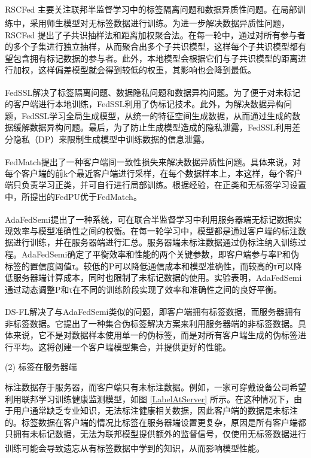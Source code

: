 RSCFed\textsuperscript{\cite{liang2022rscfed}} 主要关注联邦半监督学习中的标签隔离问题和数据异质性问题。在局部训练中，采用师生模型\textsuperscript{\cite{tarvainen2017mean}}对无标签数据进行训练。为进一步解决数据异质性问题，RSCFed 提出了子共识抽样法和距离加权聚合法。在每一轮中，通过对所有参与者的多个子集进行独立抽样，从而聚合出多个子共识模型，这样每个子共识模型都有望包含拥有标记数据的参与者。此外，本地模型会根据它们与子共识模型的距离进行加权，这样偏差模型就会得到较低的权重，其影响也会降到最低。

FedSSL\textsuperscript{\cite{fan2022private}}解决了标签隔离问题、数据隐私问题和数据异构问题。为了便于对未标记的客户端进行本地训练，FedSSL利用了伪标记技术。此外，为解决数据异构问题，FedSSL学习全局生成模型，从统一的特征空间生成数据，从而通过生成的数据缓解数据异构问题。最后，为了防止生成模型造成的隐私泄露，FedSSL利用差分隐私（DP）来限制生成模型中训练数据的信息泄露。

FedMatch\textsuperscript{\cite{jeong2020federated}}提出了一种客户端间一致性损失来解决数据异质性问题。具体来说，对每个客户端的前k个最近客户端进行采样，在每个数据样本上，本这样，每个客户端只负责学习正类，并可自行进行局部训练。根据经验，在正类和无标签学习设置中，所提出的FedPU优于FedMatch。


AdaFedSemi\textsuperscript{\cite{wang2022enhancing}}提出了一种系统，可在联合半监督学习中利用服务器端无标记数据实现效率与模型准确性之间的权衡。在每一轮学习中，模型都是通过客户端的标注数据进行训练，并在服务器端进行汇总。服务器端未标注数据通过伪标注纳入训练过程。AdaFedSemi确定了平衡效率和性能的两个关键参数，即客户端参与率P和伪标签的置信度阈值τ。较低的P可以降低通信成本和模型准确性，而较高的τ可以降低服务器端计算成本，同时也限制了未标记数据的使用。实验表明，AdaFedSemi通过动态调整P和τ在不同的训练阶段实现了效率和准确性之间的良好平衡。


DS-FL\textsuperscript{\cite{itahara2021distillation}}解决了与AdaFedSemi类似的问题，即客户端拥有标签数据，而服务器拥有非标签数据。它提出了一种集合伪标签解决方案来利用服务器端的非标签数据。具体来说，它不是对数据样本使用单一的伪标签，而是对所有客户端生成的伪标签进行平均。这将创建一个客户端模型集合，并提供更好的性能。

(2) 标签在服务器端

标注数据存于服务器，而客户端只有未标注数据。例如，一家可穿戴设备公司希望利用联邦学习训练健康监测模型，如图 \ref{LabelAtServer} 所示。在这种情况下，由于用户通常缺乏专业知识，无法标注健康相关数据，因此客户端的数据是未标注的。标签数据在客户端的情况比标签在服务器端设置更复杂，原因是所有客户端都只拥有未标记数据，无法为联邦模型提供额外的监督信号，仅使用无标签数据进行训练可能会导致遗忘从有标签数据中学到的知识，从而影响模型性能\textsuperscript{\cite{jeong2020federated,diao2022semifl}}。

